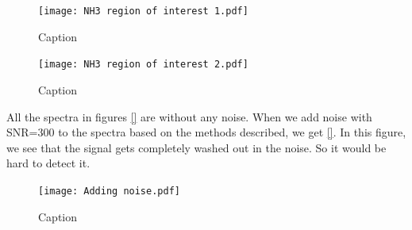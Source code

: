 \documentclass[twoside, single, authoryear, semicolon]{lion-msc}
\newcommand{\4}{$_4$}
\newcommand{\3}{$_3$}
\newcommand{\2}{$_2$}
\begin{document}
\begin{figure}[!ht]
    \centering
    \texttt{[image: NH3 region of interest 1.pdf]}
    \caption{Caption}
    \label{fig:enter-label}
\end{figure}
\begin{figure}[!ht]
    \centering
    \texttt{[image: NH3 region of interest 2.pdf]}
    \caption{Caption}
    \label{fig:enter-label}
\end{figure}
All the spectra in figures \ref{} are without any noise. When we add noise with SNR=300 to the spectra based on the methods described, we get \ref{}. In this figure, we see that the signal gets completely washed out in the noise. So it would be hard to detect it. 
\begin{figure}[!ht]
    \centering
    \texttt{[image: Adding noise.pdf]}
    \caption{Caption}
    \label{fig:enter-label}
\end{figure}
\end{document}
